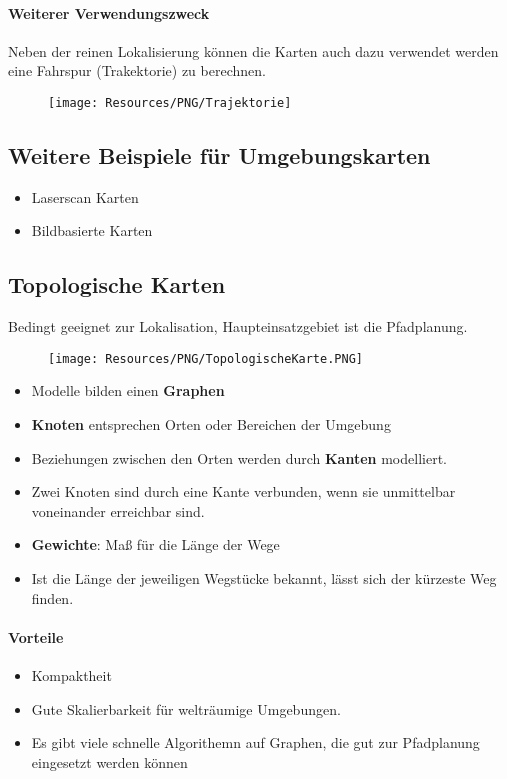 \paragraph{Weiterer Verwendungszweck}
Neben der reinen Lokalisierung können die Karten auch dazu verwendet werden eine Fahrspur (Trakektorie) zu berechnen.
\begin{figure}[H]
	\begin{center}
		\texttt{[image: Resources/PNG/Trajektorie]}
		\caption{}
		\label{fig:PNG/Trajektorie}
	\end{center}
\end{figure}
\subsection{Weitere Beispiele für Umgebungskarten}
\begin{itemize}
	\item Laserscan Karten
	\item Bildbasierte Karten
\end{itemize}
\subsection{Topologische Karten}
Bedingt geeignet zur Lokalisation, Haupteinsatzgebiet ist die Pfadplanung.
\begin{figure}[H]
	\begin{center}
		\texttt{[image: Resources/PNG/TopologischeKarte.PNG]}
		\caption{}
		\label{fig:PNG/TopologischeKarte.PNG}
	\end{center}
\end{figure}
\begin{itemize}
	\item Modelle bilden einen \textbf{Graphen}
	\item \textbf{Knoten} entsprechen Orten oder Bereichen der Umgebung
	\item Beziehungen zwischen den Orten werden durch \textbf{Kanten} modelliert.
	\item Zwei Knoten sind durch eine Kante verbunden, wenn sie unmittelbar voneinander erreichbar sind.
	\item \textbf{Gewichte}: Maß für die Länge der Wege
	\item Ist die Länge der jeweiligen Wegstücke bekannt, lässt sich der kürzeste Weg finden.
\end{itemize}
\paragraph{Vorteile}
\begin{itemize}
	\item Kompaktheit
	\item Gute Skalierbarkeit für welträumige Umgebungen.
	\item Es gibt viele schnelle Algorithemn auf Graphen, die gut zur Pfadplanung eingesetzt werden können
\end{itemize}
